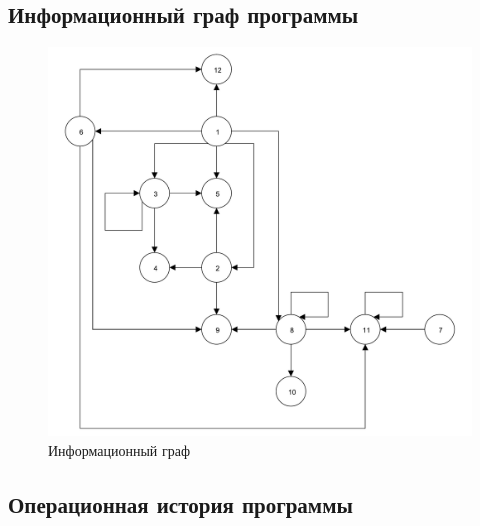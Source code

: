 \clearpage

\subsection{Информационный граф программы}

\begin{figure}[h]
	\centering
	\includegraphics[height=0.6\textheight, page=1]{img/информационный_граф.pdf}
	\caption{Информационный граф}
\end{figure}

\clearpage

\subsection{Операционная история программы}


